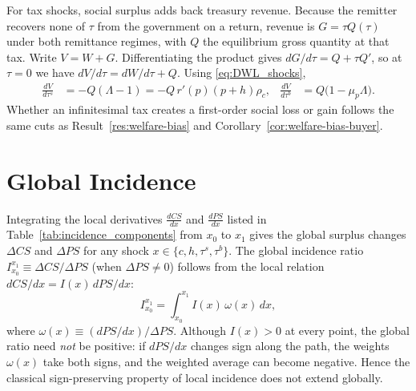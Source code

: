 \documentclass[11pt]{article}
\begin{document}
For tax shocks, social surplus adds back treasury revenue.  Because the
remitter recovers none of $\tau$ from the government on a return, revenue is
$G=\tau Q(\tau)$ under both remittance regimes, with $Q$ the equilibrium
gross quantity at that tax.  Write $V=W+G$.  Differentiating the product
gives $dG/d\tau=Q+\tau Q'$, so at $\tau=0$ we have $dV/d\tau=dW/d\tau+Q$.
Using \eqref{eq:DWL_shocks},
\begin{align}
  \frac{dV}{d\tau^s}
  &= -Q(\Lambda-1)
  = -Q\,r'(p)(p+h)\rho_c,
  &
  \frac{dV}{d\tau^b}
  &= Q\bigl(1-\mu_p\Lambda\bigr).
  \label{eq:DWL_V_tax}
\end{align}
Whether an infinitesimal tax creates a first-order social loss or gain
follows the same cuts as Result~\ref{res:welfare-bias} and
Corollary~\ref{cor:welfare-bias-buyer}.

\section{Global Incidence}
\label{sec:global-incidence}

Integrating the local derivatives $\frac{dCS}{dx}$ and $\frac{dPS}{dx}$ listed
in Table~\ref{tab:incidence_components} from $x_0$ to $x_1$ gives the global
surplus changes $\Delta CS$ and $\Delta PS$ for any shock
$x\in\{c,h,\tau^s,\tau^b\}$.  The global incidence ratio
$I_{x_0}^{x_1}\equiv \Delta CS/\Delta PS$ (when $\Delta PS\neq0$) follows from
the local relation $dCS/dx = I(x)\,dPS/dx$:
\begin{equation}
I_{x_0}^{x_1} = \int_{x_0}^{x_1} I(x)\,\omega(x)\,dx,
\label{eq:global-incidence-final}
\end{equation}
where $\omega(x)\equiv (dPS/dx)/\Delta PS$.  Although $I(x)>0$ at every point,
the global ratio need \emph{not} be positive: if $dPS/dx$ changes sign along
the path, the weights $\omega(x)$ take both signs, and the weighted average
can become negative.  Hence the classical sign-preserving property of local
incidence does not extend globally.





\end{document}
